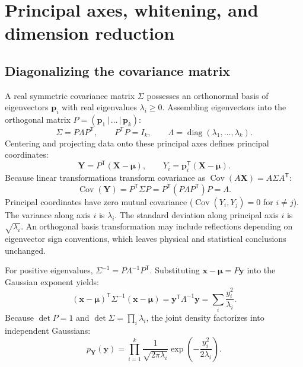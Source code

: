 \section{Principal axes, whitening, and dimension reduction}
\label{sec:l05-pca}
\subsection{Diagonalizing the covariance matrix}
\label{subsec:l05-diagonalization}
A real symmetric covariance matrix $\Sigma$ possesses an orthonormal basis of eigenvectors $\mathbf p_i$ with real eigenvalues $\lambda_i\geq0$. Assembling eigenvectors into the orthogonal matrix $P=(\mathbf p_1 \,|\, \dots \,|\, \mathbf p_k)$:
\begin{equation}
\Sigma=P\Lambda P^{\mathsf T},\qquad
P^{\mathsf T}P=I_k,\qquad
\Lambda=\operatorname{diag}(\lambda_1,\ldots,\lambda_k).
\label{eq:l05-eigendecomposition}
\end{equation}
Centering and projecting data onto these principal axes defines principal coordinates:
\begin{equation}
\mathbf Y=P^{\mathsf T}(\mathbf X-\boldsymbol\mu),\qquad
Y_i=\mathbf p_i^{\mathsf T}(\mathbf X-\boldsymbol\mu).
\label{eq:l05-pc-coordinates}
\end{equation}
Because linear transformations transform covariance as $\operatorname{Cov}(A\mathbf X)=A\Sigma A^{\mathsf T}$:
\begin{equation}
\operatorname{Cov}(\mathbf Y)
=P^{\mathsf T}\Sigma P
=P^{\mathsf T}(P\Lambda P^{\mathsf T})P=\Lambda.
\label{eq:l05-pc-covariance}
\end{equation}
Principal coordinates have zero mutual covariance ($\operatorname{Cov}(Y_i, Y_j)=0$ for $i\neq j$). The variance along axis $i$ is $\lambda_i$. The standard deviation along principal axis $i$ is $\sqrt{\lambda_i}$. An orthogonal basis transformation may include reflections depending on eigenvector sign conventions, which leaves physical and statistical conclusions unchanged.

For positive eigenvalues, $\Sigma^{-1}=P\Lambda^{-1}P^{\mathsf T}$. Substituting $\mathbf x-\boldsymbol\mu=P\mathbf y$ into the Gaussian exponent yields:
\begin{equation}
(\mathbf x-\boldsymbol\mu)^{\mathsf T}\Sigma^{-1}(\mathbf x-\boldsymbol\mu)
=\mathbf y^{\mathsf T}\Lambda^{-1}\mathbf y
=\sum_i\frac{y_i^2}{\lambda_i}.
\label{eq:l05-pca-quadratic}
\end{equation}
Because $\det P = 1$ and $\det\Sigma = \prod_i \lambda_i$, the joint density factorizes into independent Gaussians:
\begin{equation}
p_{\mathbf Y}(\mathbf y)
=\prod_{i=1}^k\frac1{\sqrt{2\pi\lambda_i}}
\exp\left(-\frac{y_i^2}{2\lambda_i}\right).
\label{eq:l05-pca-factorization}
\end{equation}

